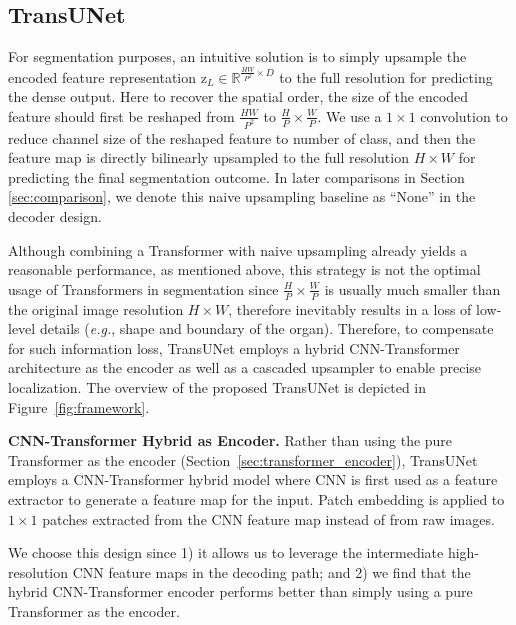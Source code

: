 \documentclass[runningheads]{llncs}
\begin{document}
\subsection{TransUNet}
\label{sec:transunet}
For segmentation purposes, an intuitive solution is to simply upsample the encoded feature representation $\bm{\mathrm{z}}_L \in \mathbb{R}^{\frac{HW}{P^2} \times D}$ to the full resolution for predicting the dense output.
Here to recover the spatial order, the size of the encoded feature should first be reshaped from $\frac{HW}{P^2}$  to $\frac{H}{P} \times \frac{W}{P}$.
We use a  $1 \times 1$ convolution to reduce channel size of the reshaped feature to number of class, and then the feature map is directly bilinearly upsampled to the full resolution $H \times W$ for predicting the final segmentation outcome. In later comparisons in Section \ref{sec:comparison}, we denote this naive upsampling baseline as ``None'' in the decoder design. 

Although combining a Transformer with naive upsampling already yields a reasonable performance, as mentioned above, this strategy is not the optimal usage of Transformers in segmentation since $\frac{H}{P} \times \frac{W}{P}$ is usually much smaller than the original image resolution $H \times W$, therefore inevitably results in a loss of low-level details (\emph{e.g.}, shape and boundary of the organ).
Therefore, to compensate for such information loss, TransUNet employs a hybrid CNN-Transformer architecture as the encoder as well as a cascaded upsampler to enable precise localization. The overview of the proposed TransUNet is depicted in Figure~\ref{fig:framework}.


\vspace{1ex}\noindent\textbf{CNN-Transformer Hybrid as Encoder.}
Rather than using the pure Transformer as the encoder (Section~\ref{sec:transformer_encoder}), TransUNet employs a  CNN-Transformer hybrid model where CNN is first used as a feature extractor to generate a feature map for the input. Patch embedding is applied to $1\times1$ patches extracted from the CNN feature map instead of from raw images. 

We choose this design since 1) it allows us to leverage the intermediate high-resolution CNN feature maps in the decoding path; and 2) we find that the hybrid CNN-Transformer encoder performs better than simply using a pure Transformer as the encoder.
\end{document}
